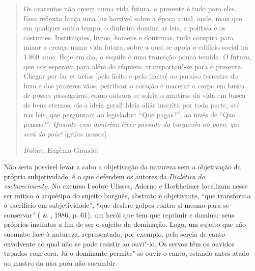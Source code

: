 \begin{quote}
Os avarentos não creem numa vida futura, o presente é tudo para eles.
Essa reflexão lança uma luz horrível sobre a época atual, onde, mais que
em qualquer outro tempo, o dinheiro domina as leis, a política e os
costumes. Instituições, livros, homens e doutrinas, tudo conspira para
minar a crença numa vida futura, sobre a qual se apoia o edifício social
há 1.800 anos. Hoje em dia, o esquife é uma transição pouco temida. O
futuro, que nos esperava para além do réquiem, transportou"-se para o
presente. Chegar per fas et nefas [pelo lícito e pelo ilícito] ao
paraíso terrestre do luxo e dos prazeres vãos, petrificar o coração e
macerar o corpo em busca de posses passageiras, como outrora se sofria o
martírio da vida em busca de bens eternos, eis a ideia geral! Ideia
aliás inscrita por toda parte, até nas leis, que perguntam ao
legislador: ``Que pagas?'', ao invés de ``Que pensas?''. \emph{Quando
essa doutrina tiver passado da burguesia ao povo, que será do país?}
[grifos nossos]

\emph{Balzac}, Eugênia Grandet
\end{quote}

Não seria possível levar a cabo a objetivação da natureza sem a
objetivação da própria subjetividade, é o que defendem os autores da
\emph{Dialética} \emph{do} \emph{esclarecimento.} No excurso I sobre
Ulisses, Adorno e Horkheimer localizam nesse ser mítico o arquétipo do
sujeito burguês, abstrato e objetivante, ``que transforma o sacrifício
em subjetividade'', ``que desfere golpes contra si mesmo para se
conservar'' ( \& , 1986, p. 61), um herói que tem que
reprimir e dominar seus próprios instintos a fim de ser o sujeito da
dominação. Logo, um sujeito que não sucumbe face à natureza,
representada, por exemplo, pela sereia de canto envolvente ao qual não
se pode resistir ao ouvi"-lo. Os servos têm os ouvidos tapados com cera.
Já o dominante permite"-se ouvir o canto, estando antes atado ao mastro
da nau para não sucumbir.

